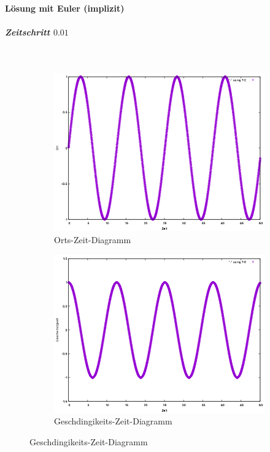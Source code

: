 \documentclass[
    oneside,
    ngerman,
    footinclude=false,
    captions=tableheading,
    DIV=12
]{scrartcl}
\begin{document}
        \paragraph{Lösung mit Euler (implizit)}
            \subparagraph*{Zeitschritt $0.01$}\,
            \begin{figure}[H]
                \centering
                \begin{subfigure}[b]{0.45\textwidth}
                    \centering
                    \includegraphics[width=\textwidth]{Bilddateien/impEulerA1(a)-001h-x.png}
                    \caption{Orts-Zeit-Diagramm}
                    \label{fig:impEulerA1(a)-001-0-x}
                \end{subfigure}
                \hfill
                \begin{subfigure}[b]{0.45\textwidth}
                    \centering
                    \includegraphics[width=\textwidth]{Bilddateien/impEulerA1(a)-001h-v.png}
                    \caption{Geschdingikeits-Zeit-Diagramm}
                    \label{fig:impEulerA1(a)-001-0-v}
                \end{subfigure}
            \end{figure}
            
\end{document}
